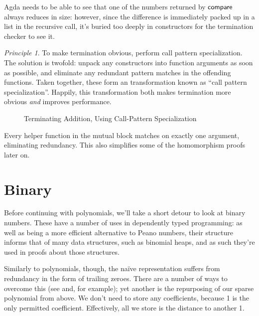 \documentclass[draft, twocolumn]{article}
\theoremstyle{definition}
\theoremstyle{remark}
\newtheorem{principle}{Principle}[section]
\begin{document}
Agda needs to be able to see that one of the numbers returned by
\(\AgdaFunction{compare}\) always reduces in size: however, since the difference
is immediately packed up in a list in the recursive call, it's buried too deeply
in constructors for the termination checker to see it.

\begin{principle}{To make termination obvious, perform call pattern
    specialization.}
The solution is twofold: unpack any constructors into function arguments as soon
as possible, and eliminate any redundant pattern matches in the offending
functions. Taken together, these form an transformation known as ``call pattern
specialization''\cite{jones_call-pattern_2007}\footnotemark. Happily, this
transformation both makes termination more obvious \emph{and} improves
performance.
\end{principle}


\begin{figure}[h]
  \caption{Terminating Addition, Using Call-Pattern Specialization}
  \label{mono-addition}
\end{figure}
Every helper function in the mutual block matches on exactly one argument,
eliminating redundancy. This also simplifies some of the homomorphism proofs
later on.

\section{Binary}
Before continuing with polynomials, we'll take a short detour to look at binary
numbers. These have a number of uses in dependently typed programming: as well
as being a more efficient alternative to Peano numbers, their structure informs
that of many data structures, such as binomial heaps, and as such they're used
in proofs about those structures.

Similarly to polynomials, though, the naïve representation suffers from
redundancy in the form of trailing zeroes. There are a number of ways to
overcome this (see\cite{meshveliani_binary-4_2018}
and\cite{escardo_libraries_2018}, for example); yet another is the repurposing
of our sparse polynomial from above.
We don't need to store any coefficients, because 1 is the only permitted
coefficient. Effectively, all we store is the distance to another 1.
\end{document}
